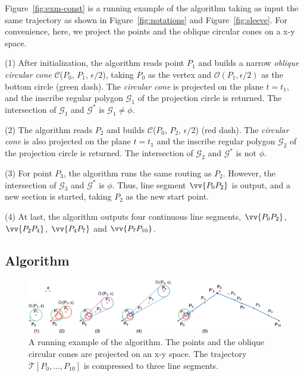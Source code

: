 \begin{example}
\label{exm-alg-conest}
Figure~\ref{fig:exm-const} is a running example of the \cist algorithm taking as input the same trajectory as shown in Figure~\ref{fig:notations} and Figure~\ref{fig:sleeve}.
For convenience, here, we project the points and the oblique circular cones on a x-y space.

\sstab (1) After initialization, the \cist algorithm reads point $P_1$ and builds a narrow \emph{oblique circular cone} $\mathcal{C}$($P_0$, $P_{1}$, $\epsilon/2$), taking $P_0$ as the vertex and $\mathcal{O}(P_1, \epsilon/2)$ as the bottom circle (green dash). The \emph{circular cone} is projected on the plane $t=t_1$, and the inscribe regular polygon $\mathcal{G}_1$ of the projection circle is returned. The intersection of $\mathcal{G}_1$ and $\mathcal{G}^*$ is $\mathcal{G}_1 \ne \phi$.

\sstab (2) The algorithm reads $P_2$ and builds $\mathcal{C}$($P_0$, $P_{2}$, $\epsilon/2$) (red dash). The \emph{circular cone} is also projected on the plane $t=t_1$ and the inscribe regular polygon $\mathcal{G}_2$ of the projection circle is returned. The intersection of $\mathcal{G}_2$ and $\mathcal{G}^*$ is not $\phi$.

\sstab (3) For point $P_3$, the algorithm runs the same routing as $P_2$. However, the intersection of $\mathcal{G}_3$ and $\mathcal{G}^*$ is $\phi$. Thus, line segment $\vv{P_0P_2}$ is output, and a new section is started, taking $P_2$ as the new start point.

\sstab (4) At last, the algorithm outputs four continuous line segments, \ie $\vv{P_0P_2}$, $\vv{P_2P_4}$, $\vv{P_4P_{7}}$ and $\vv{P_7P_{10}}$.
\end{example}




\subsection{{Algorithm \cista}}


\begin{figure}[tb!]
\centering
\includegraphics[scale=0.8]{figures/Fig-conesta.png}
\vspace{-1ex}
\caption{\small A running example of the \cista algorithm. The points and the oblique circular cones are projected on an x-y space. The trajectory $\dddot{\mathcal{T}}[P_0, \ldots, P_{10}]$ is compressed to three line segments.}
\vspace{-2ex}
\label{fig:exm-consta}
\end{figure}



